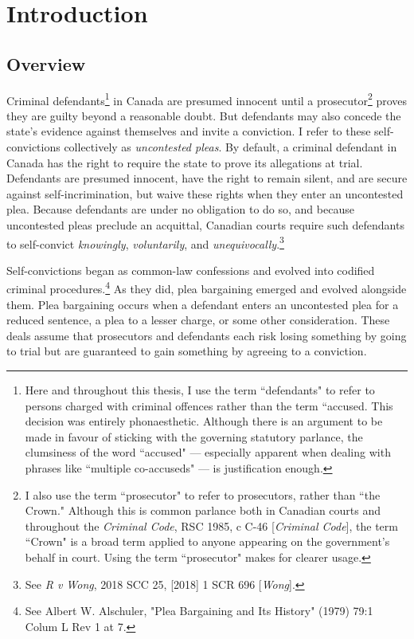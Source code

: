 \chapter{Introduction}

\section{Overview}

Criminal defendants\footnote{Here and throughout this thesis, I use the term ``defendants" to refer to persons charged with criminal offences rather than the term ``accused. This decision was entirely phonaesthetic. Although there is an argument to be made in favour of sticking with the governing statutory parlance, the clumsiness of the word ``accused" — especially apparent when dealing with phrases like ``multiple co-accuseds" — is justification enough.} in Canada are presumed innocent until a prosecutor\footnote{I also use the term ``prosecutor" to refer to prosecutors, rather than ``the Crown." Although this is common parlance both in Canadian courts and throughout the \textit{Criminal Code}, RSC 1985, c C-46 [\textit{Criminal Code}], the term ``Crown" is a broad term applied to anyone appearing on the government's behalf in court. Using the term ``prosecutor" makes for clearer usage.} proves they are guilty beyond a reasonable doubt. But defendants may also concede the state's evidence against themselves and invite a conviction. I refer to these self-convictions collectively as \textit{uncontested pleas}. By default, a criminal defendant in Canada has the right to require the state to prove its allegations at trial. Defendants are presumed innocent, have the right to remain silent, and are secure against self-incrimination, but waive these rights when they enter an uncontested plea. Because defendants are under no obligation to do so, and because uncontested pleas preclude an acquittal, Canadian courts require such defendants to self-convict \textit{knowingly}, \textit{voluntarily}, and \textit{unequivocally}.\footnote{See \textit{R v Wong}, 2018 SCC 25, [2018] 1 SCR 696 [\textit{Wong}].}

Self-convictions began as common-law confessions and evolved into codified criminal procedures.\footnote{See Albert W. Alschuler, "Plea Bargaining and Its History" (1979) 79:1 Colum L Rev 1 at 7.} As they did, plea bargaining emerged and evolved alongside them. Plea bargaining occurs when a defendant enters an uncontested plea for a reduced sentence, a plea to a lesser charge, or some other consideration. These deals assume that prosecutors and defendants each risk losing something by going to trial but are guaranteed to gain something by agreeing to a conviction.


